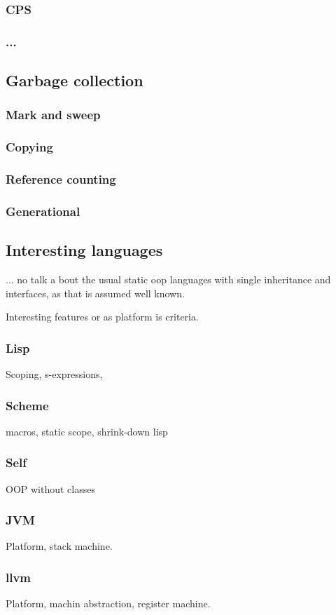 \subsubsection{CPS}
\subsubsection{...}
\subsection{Garbage collection}
\subsubsection{Mark and sweep}
\subsubsection{Copying}
\subsubsection{Reference counting}
\subsubsection{Generational}
\subsection{Interesting languages}
... no talk a bout the usual static oop languages with single inheritance and interfaces, as that is assumed well known.

Interesting features or as platform is criteria.

\subsubsection{Lisp}
Scoping, s-expressions,
\subsubsection{Scheme}
macros, static scope, shrink-down lisp
\subsubsection{Self}
OOP without classes
\subsubsection{JVM}
Platform, stack machine.
\subsubsection{llvm}
Platform, machin abstraction, register machine.
